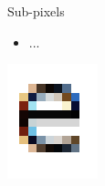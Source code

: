 \documentclass{lug}
\begin{document}
\begin{frame}{Sub-pixels}
    \noindent
    \begin{minipage}{.75\textwidth - 2em}
        \small
        \begin{itemize}
            \item ...
        \end{itemize}
    \end{minipage}%
    \hspace{1.5em}%
    \begin{minipage}{.25\textwidth}
        \includegraphics[width=\textwidth]{graphics/subpixel_e}
    \end{minipage}
\end{frame}
\end{document}
